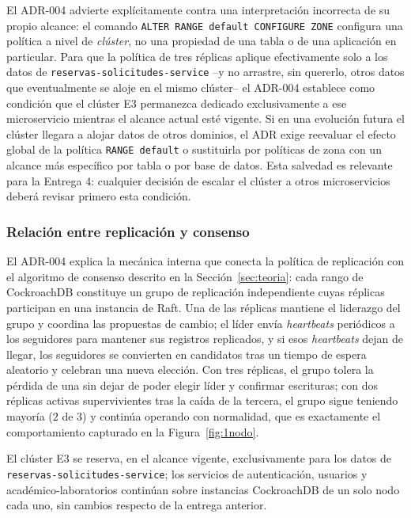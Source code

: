 \documentclass[10pt,twocolumn]{article}
\begin{document}
El ADR-004 advierte explícitamente contra una interpretación incorrecta de
su propio alcance: el comando \texttt{ALTER RANGE default CONFIGURE ZONE}
configura una política a nivel de \emph{clúster}, no una propiedad de una
tabla o de una aplicación en particular. Para que la política de tres
réplicas aplique efectivamente solo a los datos de
\texttt{reservas-solicitudes-service} --y no arrastre, sin quererlo, otros
datos que eventualmente se aloje en el mismo clúster-- el ADR-004 establece
como condición que el clúster E3 permanezca dedicado exclusivamente a ese
microservicio mientras el alcance actual esté vigente. Si en una evolución
futura el clúster llegara a alojar datos de otros dominios, el ADR exige
reevaluar el efecto global de la política \texttt{RANGE default} o
sustituirla por políticas de zona con un alcance más específico por tabla
o por base de datos. Esta salvedad es relevante para la Entrega 4: cualquier
decisión de escalar el clúster a otros microservicios deberá revisar
primero esta condición.

\subsubsection{Relación entre replicación y consenso}

El ADR-004 explica la mecánica interna que conecta la política de
replicación con el algoritmo de consenso descrito en la
Sección~\ref{sec:teoria}: cada rango de CockroachDB constituye un grupo de
replicación independiente cuyas réplicas participan en una instancia de
Raft. Una de las réplicas mantiene el liderazgo del grupo y coordina las
propuestas de cambio; el líder envía \emph{heartbeats} periódicos a los
seguidores para mantener sus registros replicados, y si esos
\emph{heartbeats} dejan de llegar, los seguidores se convierten en
candidatos tras un tiempo de espera aleatorio y celebran una nueva
elección. Con tres réplicas, el grupo tolera la pérdida de una sin dejar de
poder elegir líder y confirmar escrituras; con dos réplicas activas
supervivientes tras la caída de la tercera, el grupo sigue teniendo mayoría
($2$ de $3$) y continúa operando con normalidad, que es exactamente el
comportamiento capturado en la Figura~\ref{fig:1nodo}.

El clúster E3
se reserva, en el alcance vigente, exclusivamente para los datos de
\texttt{reservas-solicitudes-service}; los servicios de autenticación,
usuarios y académico-laboratorios continúan sobre instancias CockroachDB de
un solo nodo cada uno, sin cambios respecto de la entrega anterior.
\end{document}
